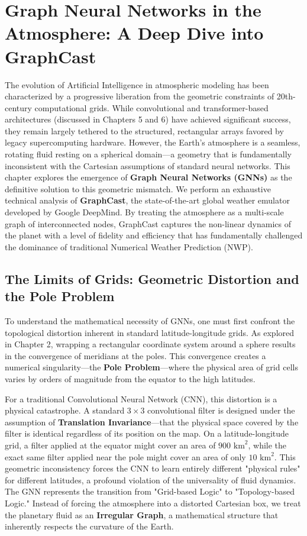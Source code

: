 \chapter{Graph Neural Networks in the Atmosphere: A Deep Dive into GraphCast}

The evolution of Artificial Intelligence in atmospheric modeling has been characterized by a progressive liberation from the geometric constraints of 20th-century computational grids. While convolutional and transformer-based architectures (discussed in Chapters 5 and 6) have achieved significant success, they remain largely tethered to the structured, rectangular arrays favored by legacy supercomputing hardware. However, the Earth’s atmosphere is a seamless, rotating fluid resting on a spherical domain—a geometry that is fundamentally inconsistent with the Cartesian assumptions of standard neural networks. This chapter explores the emergence of \textbf{Graph Neural Networks (GNNs)} as the definitive solution to this geometric mismatch. We perform an exhaustive technical analysis of \textbf{GraphCast}, the state-of-the-art global weather emulator developed by Google DeepMind. By treating the atmosphere as a multi-scale graph of interconnected nodes, GraphCast captures the non-linear dynamics of the planet with a level of fidelity and efficiency that has fundamentally challenged the dominance of traditional Numerical Weather Prediction (NWP).

\section{The Limits of Grids: Geometric Distortion and the Pole Problem}

To understand the mathematical necessity of GNNs, one must first confront the topological distortion inherent in standard latitude-longitude grids. As explored in Chapter 2, wrapping a rectangular coordinate system around a sphere results in the convergence of meridians at the poles. This convergence creates a numerical singularity—the \textbf{Pole Problem}—where the physical area of grid cells varies by orders of magnitude from the equator to the high latitudes. 

For a traditional Convolutional Neural Network (CNN), this distortion is a physical catastrophe. A standard $3 \times 3$ convolutional filter is designed under the assumption of \textbf{Translation Invariance}—that the physical space covered by the filter is identical regardless of its position on the map. On a latitude-longitude grid, a filter applied at the equator might cover an area of $900 \text{ km}^2$, while the exact same filter applied near the pole might cover an area of only $10 \text{ km}^2$. This geometric inconsistency forces the CNN to learn entirely different "physical rules" for different latitudes, a profound violation of the universality of fluid dynamics. The GNN represents the transition from "Grid-based Logic" to "Topology-based Logic." Instead of forcing the atmosphere into a distorted Cartesian box, we treat the planetary fluid as an \textbf{Irregular Graph}, a mathematical structure that inherently respects the curvature of the Earth.

